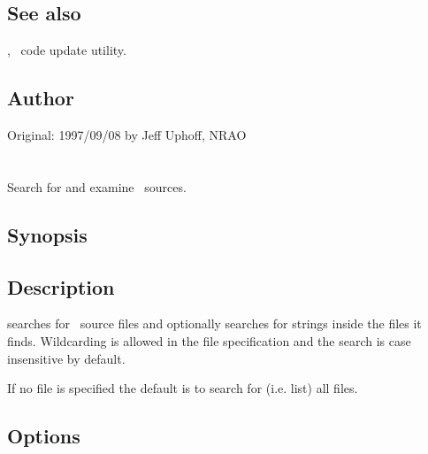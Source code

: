 \subsection*{See also}

, \aipspp\ code update utility.

\subsection*{Author}

Original: 1997/09/08 by Jeff Uphoff, NRAO


\newpage
\section{}
\label{squiz}

Search for and examine \aipspp\ sources.

\subsection*{Synopsis}

\begin{synopsis}
\end{synopsis}

\subsection*{Description}

 searches for \aipspp\ source files and optionally searches for
strings inside the files it finds.  Wildcarding is allowed in the file
specification and the search is case insensitive by default.

If no file is specified the default is to search for (i.e. list) all files.

\subsection*{Options}

